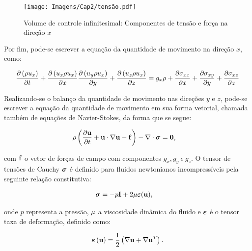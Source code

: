 \documentclass[tese_patricia]{subfiles}%
\begin{document}
\begin{figure}[htb!]
	\centering 
	\texttt{[image: Imagens/Cap2/tensão.pdf]}	
	\caption{Volume de controle infinitesimal: Componentes de tensão e força na direção $x$}
	\label{fig:VolInfiFor}
\end{figure}

Por fim, pode-se escrever a equação da quantidade de movimento na direção $x$, como:

\begin{align}
	\frac{\partial\left(\rho u_{x}\right)}{\partial t} + \frac{\partial\left(u_{x}\rho u_{x}\right)}{\partial x} 	\frac{\partial\left(u_{y}\rho u_{x}\right)}{\partial y} +\frac{\partial\left(u_{z}\rho u_{x}\right)}{\partial z} = g_x \rho + \frac{\partial \sigma_{xx}}{\partial x} + \frac{\partial \sigma_{xy}}{\partial y} + \frac{\partial \sigma_{xz}}{\partial z} 
\end{align}

Realizando-se o balanço da quantidade de movimento nas direções $y$ e $z$, pode-se escrever a equação da quantidade de movimento em sua forma vetorial, chamada também de equações de Navier-Stokes, da forma que se segue:

\begin{align}
\rho\left(\frac{\partial\mathbf{u}}{\partial t} + \mathbf{u}\cdot\nabla\mathbf{u} - \mathbf{f} \right) - \nabla \cdot \boldsymbol{\sigma} &= \mathbf{0} , \label{eq:Navier-Stokes} 
\end{align}

\noindent com $\mathbf{f}$ o vetor de forças de campo com componentes $g_x, g_y \ e \ g_z$. O tensor de tensões de Cauchy $\boldsymbol{\sigma}$ é definido para fluidos newtonianos incompressíveis pela seguinte relação constitutiva:

\begin{align}
\boldsymbol{\sigma} &= -p\mathbf{I} + 2\mu\bm{\varepsilon}(\mathbf{u}),\label{eq:StressTensor}
\end{align}

\noindent onde $p$ representa a pressão, $\mu$ a viscosidade dinâmica do fluido e $\bm{\varepsilon}$ é o tensor taxa de deformação, definido como:


\begin{align}
\bm{\varepsilon}\left(\mathbf{u}\right) = \frac{1}{2}\left(\nabla\mathbf{u} + \nabla\mathbf{u}^{T}\right). 
\label{eq:StrainTensor}
\end{align}
\end{document}
